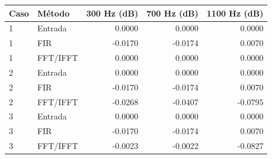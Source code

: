 \begin{tabular}{llrrr}\toprule
Caso & Método & 300 Hz (dB) & 700 Hz (dB) & 1100 Hz (dB)\\\midrule
1 & Entrada & 0.0000 & 0.0000 & 0.0000\\
1 & FIR & -0.0170 & -0.0174 & 0.0070\\
1 & FFT/IFFT & 0.0000 & 0.0000 & 0.0000\\
2 & Entrada & 0.0000 & 0.0000 & 0.0000\\
2 & FIR & -0.0170 & -0.0174 & 0.0070\\
2 & FFT/IFFT & -0.0268 & -0.0407 & -0.0795\\
3 & Entrada & 0.0000 & 0.0000 & 0.0000\\
3 & FIR & -0.0170 & -0.0174 & 0.0070\\
3 & FFT/IFFT & -0.0023 & -0.0022 & -0.0827\\
\bottomrule\end{tabular}
